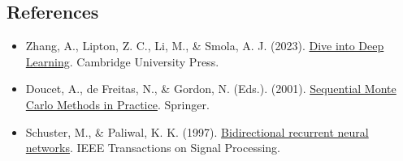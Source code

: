 \FloatBarrier
{}
\hypertarget{references-23}{%
\subsection{References}\label{references-23}}

\vspace{0.25em}
\begin{itemize}
\tightlist
\item
  Zhang, A., Lipton, Z. C., Li, M., \& Smola, A. J. (2023). \href{https://D2L.ai}{Dive into Deep Learning}. Cambridge University Press.
\item
  Doucet, A., de Freitas, N., \& Gordon, N. (Eds.). (2001). \href{https://doi.org/10.1007/978-1-4757-3437-9}{Sequential Monte Carlo Methods in Practice}. Springer.
\item
  Schuster, M., \& Paliwal, K. K. (1997). \href{https://doi.org/10.1109/78.650093}{Bidirectional recurrent neural networks}. IEEE Transactions on Signal Processing.
\end{itemize}

\clearpage
